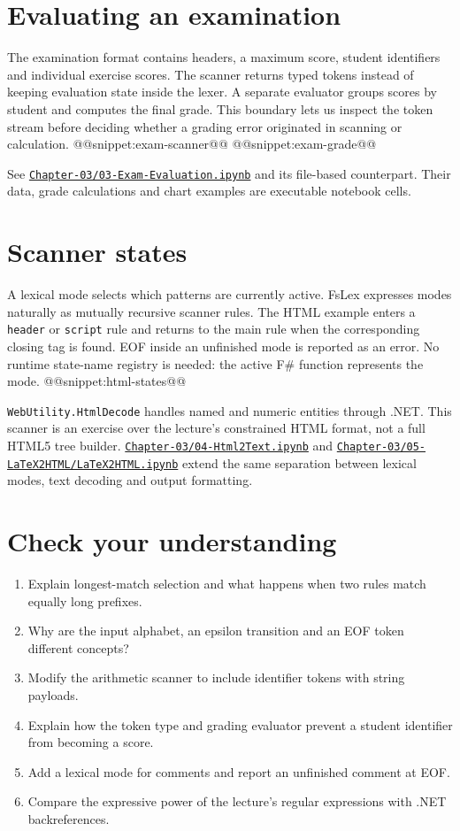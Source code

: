 \section{Evaluating an examination}
The examination format contains headers, a maximum score, student identifiers and individual exercise scores.
The scanner returns typed tokens instead of keeping evaluation state inside the lexer.
A separate evaluator groups scores by student and computes the final grade.
This boundary lets us inspect the token stream before deciding whether a grading error originated in scanning or calculation.
@@snippet:exam-scanner@@
@@snippet:exam-grade@@

See \href{../../Chapter-03/03-Exam-Evaluation.ipynb}{\nolinkurl{Chapter-03/03-Exam-Evaluation.ipynb}} and its file-based counterpart.
Their data, grade calculations and chart examples are executable notebook cells.

\section{Scanner states}
A lexical mode selects which patterns are currently active.
FsLex expresses modes naturally as mutually recursive scanner rules.
The HTML example enters a \texttt{header} or \texttt{script} rule and returns to the main rule when the corresponding closing tag is found.
EOF inside an unfinished mode is reported as an error.
No runtime state-name registry is needed: the active F\# function represents the mode.
@@snippet:html-states@@

\texttt{WebUtility.HtmlDecode} handles named and numeric entities through .NET.
This scanner is an exercise over the lecture's constrained HTML format, not a full HTML5 tree builder.
\href{../../Chapter-03/04-Html2Text.ipynb}{\nolinkurl{Chapter-03/04-Html2Text.ipynb}} and \href{../../Chapter-03/05-LaTeX2HTML/LaTeX2HTML.ipynb}{\nolinkurl{Chapter-03/05-LaTeX2HTML/LaTeX2HTML.ipynb}} extend the same separation between lexical modes, text decoding and output formatting.

\section{Check your understanding}
\begin{enumerate}
\item Explain longest-match selection and what happens when two rules match equally long prefixes.
\item Why are the input alphabet, an epsilon transition and an EOF token different concepts?
\item Modify the arithmetic scanner to include identifier tokens with string payloads.
\item Explain how the token type and grading evaluator prevent a student identifier from becoming a score.
\item Add a lexical mode for comments and report an unfinished comment at EOF.
\item Compare the expressive power of the lecture's regular expressions with .NET backreferences.
\end{enumerate}
